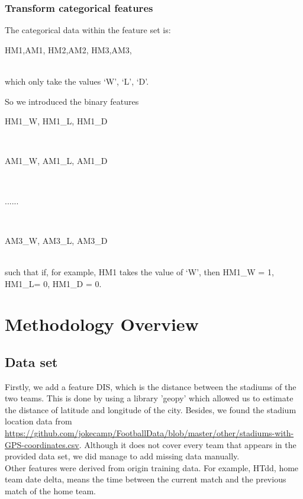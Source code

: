 \documentclass{article}
\begin{document}
\subsubsection{Transform categorical features}
The categorical data within the feature set is: \\
		\centerline{HM1,AM1, HM2,AM2, HM3,AM3, }\\
which only take the values {‘W’, ‘L’, ‘D’}.

So we introduced the binary features		\\
\centerline{HM1\_W, HM1\_L, HM1\_D}	\\
\centerline{AM1\_W, AM1\_L, AM1\_D}		\\	
\centerline{......}		\\
\centerline{AM3\_W, AM3\_L, AM3\_D}		\\
such that if, for example, HM1 takes the value of ‘W’,  then HM1\_W = 1, HM1\_L= 0, HM1\_D = 0. 

\section{Methodology Overview}

\subsection{Data set}
Firstly, we add a feature DIS, which is the distance between the stadiums of the two teams. This is done by using a library 'geopy' which allowed us to estimate the distance of latitude and longitude of the city. Besides, we found the stadium location data from \url{https://github.com/jokecamp/FootballData/blob/master/other/stadiums-with-GPS-coordinates.csv}. Although it does not cover every team that appears in the provided data set, we did manage to add missing data manually.\\
Other features were derived from origin training data. For example, HTdd, home team date delta, means the time between the current match and the previous match of the home team. \\
\end{document}
